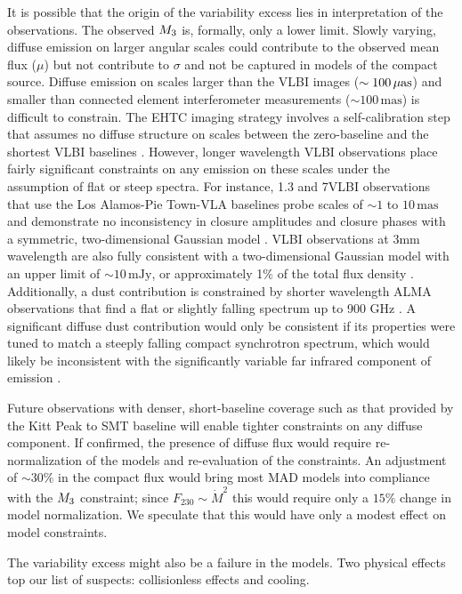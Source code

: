 It is possible that the origin of the variability excess lies in interpretation of the observations.
The observed $M_{3}$ is, formally, only a lower limit.  Slowly varying, diffuse emission on larger angular scales could contribute to the observed mean flux ($\mu$) but not contribute to $\sigma$ and not be captured in models of the compact source.  Diffuse emission on scales larger than the VLBI images ($\sim 100\,\mathrm{\mu as}$) and smaller than connected element interferometer measurements ($\sim 100\,\mathrm{mas}$) is difficult to constrain.  The EHTC imaging strategy involves a self-calibration step that assumes no diffuse structure on scales between the zero-baseline and the shortest VLBI baselines .  However, longer wavelength VLBI observations place fairly significant constraints on any emission on these scales under the assumption of flat or steep spectra.  For instance, 1.3 and 7\mm VLBI observations that use the Los Alamos-Pie Town-VLA baselines probe scales of $\sim 1$ to $10\,\mathrm{mas}$ and demonstrate no inconsistency in closure amplitudes and closure phases with a symmetric, two-dimensional Gaussian model \citep{2004Sci...304..704B}.  VLBI observations at 3mm wavelength are also fully consistent with a two-dimensional Gaussian model with an upper limit of $\sim 10\,\mathrm{mJy}$, or approximately 1\% of the total flux density \citep{2019A&A...621A.119B}.  Additionally, a dust contribution is constrained by shorter wavelength ALMA observations that find a flat or slightly falling spectrum up to 900 GHz \citep{2019ApJ...881L...2B}.  A significant diffuse dust contribution would only be consistent if its properties were tuned to match a steeply falling compact synchrotron spectrum, which would likely be inconsistent with the significantly variable far infrared component of \sgra emission \citep{2016ApJ...825...32S, 2018ApJ...862..129V}.

Future observations with denser, short-baseline coverage such as that provided by the Kitt Peak to SMT baseline will enable tighter constraints on any diffuse component.  If confirmed, the presence of diffuse flux would require re-normalization of the models and re-evaluation of the constraints.  An adjustment of $\sim 30\%$ in the compact flux would bring most MAD models into compliance with the $M_{3}$ constraint; since $F_{230} \sim \dot{M}^2$ this would require only a $15\%$ change in model normalization.  We speculate that this would have only a modest effect on model constraints.

The variability excess might also be a failure in the models.  Two physical effects top our list of suspects: collisionless effects and cooling.

